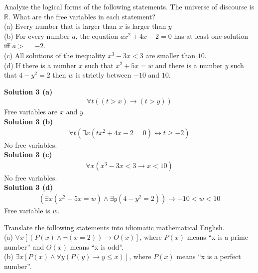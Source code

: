 \begin{tcolorbox}[title=Problem 3, breakable]
Analyze the logical forms of the following statements. The universe of discourse
is $\mathbb{R}$. What are the free variables in each statement? \\
(a) Every number that is larger than $x$ is larger than $y$ \\
(b) For every number $a$, the equation $ax^2 + 4x - 2 = 0$ has at least one
 solution iff $a >= -2$. \\
(c) All solutions of the inequality $x^3 - 3x < 3$ are smaller than $10$. \\
(d) If there is a number $x$ such that $x^2 + 5x = w$ and there is a number $y$
such that $4 - y^2 = 2$ then $w$ is strictly between $-10$ and $10$.
\end{tcolorbox}

\textbf{Solution 3 (a)} \\
\begin{align*}
    \forall{t}((t > x) \rightarrow (t > y))
\end{align*}
Free variables are $x$ and $y$. \\
\textbf{Solution 3 (b)} \\
\begin{align*}
    \forall{t}(\exists{x}(tx^2 +4x -2 = 0) \leftrightarrow t \ge -2)
\end{align*}
No free variables. \\
\textbf{Solution 3 (c)} \\
\begin{align*}
    \forall{x}(x^3 - 3x < 3 \rightarrow x < 10)
\end{align*}
No free variables. \\
\textbf{Solution 3 (d)} \\
\begin{align*}
    (\exists{x}(x^2 + 5x = w) \wedge \exists{y}(4 - y^2 = 2)) \rightarrow -10 < w < 10
\end{align*}
Free variable is $w$.

\begin{tcolorbox}[title=Problem 5, breakable]
Translate the following statements into idiomatic mathematical English. \\
(a) $\forall{x}[(P(x) \wedge \neg(x = 2)) \rightarrow O(x)]$, where $P(x)$ means ``x
is a prime number'' and $O(x)$ means ``x is odd''. \\
(b) $\exists{x}[P(x) \wedge \forall{y}(P(y) \rightarrow y \leq x)]$, where $P(x)$ means
``x is a perfect number''.
\end{tcolorbox}

